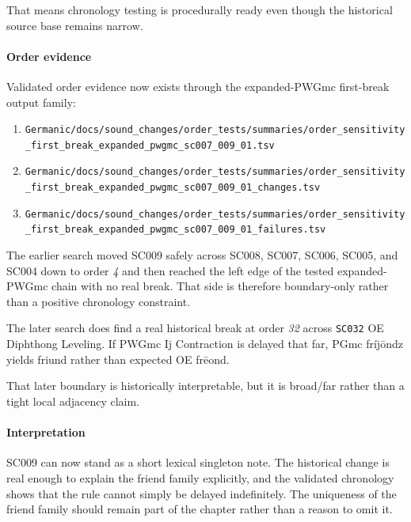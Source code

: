 \documentclass[
  british,
  a4paper,
]{article}
\providecommand{\tightlist}{%
  \setlength{\itemsep}{0pt}\setlength{\parskip}{0pt}}
\begin{document}
That means chronology testing is procedurally ready even though the
historical source base remains narrow.

\paragraph{Order evidence}\label{order-evidence-6}

Validated order evidence now exists through the expanded-PWGmc
first-break output family:

\begin{enumerate}
\def\labelenumi{\arabic{enumi}.}
\tightlist
\item
  \texttt{Germanic/docs/sound\_changes/order\_tests/summaries/order\_sensitivity\_first\_break\_expanded\_pwgmc\_sc007\_009\_01.tsv}
\item
  \texttt{Germanic/docs/sound\_changes/order\_tests/summaries/order\_sensitivity\_first\_break\_expanded\_pwgmc\_sc007\_009\_01\_changes.tsv}
\item
  \texttt{Germanic/docs/sound\_changes/order\_tests/summaries/order\_sensitivity\_first\_break\_expanded\_pwgmc\_sc007\_009\_01\_failures.tsv}
\end{enumerate}

The earlier search moved SC009 safely across SC008, SC007, SC006, SC005,
and SC004 down to order \emph{4} and then reached the left edge of the
tested expanded-PWGmc chain with no real break. That side is therefore
boundary-only rather than a positive chronology constraint.

The later search does find a real historical break at order \emph{32}
across \texttt{SC032} OE Diphthong Leveling. If PWGmc Ij Contraction is
delayed that far, PGmc fríjōndz yields friund rather than expected OE
frēond.

That later boundary is historically interpretable, but it is broad/far
rather than a tight local adjacency claim.

\paragraph{Interpretation}\label{interpretation-6}

SC009 can now stand as a short lexical singleton note. The historical
change is real enough to explain the friend family explicitly, and the
validated chronology shows that the rule cannot simply be delayed
indefinitely. The uniqueness of the friend family should remain part of
the chapter rather than a reason to omit it.
\end{document}
